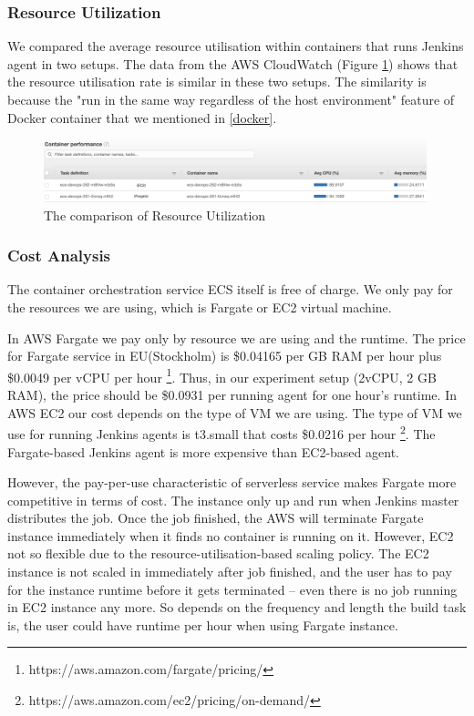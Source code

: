 \subsubsection{Resource Utilization}
We compared the average resource utilisation within containers that runs Jenkins agent in two setups. The data from the AWS CloudWatch (Figure \ref{fig:utilizationecs}) shows that the resource utilisation rate is similar in these two setups. The similarity is because the "run in the same way regardless of the host environment" \cite{WhatisaC60:online} feature of Docker container that we mentioned in \ref{docker}.
\begin{figure}[h]
\centering
\includegraphics[width=0.99\textwidth]{pics/utilizationecs.png}
\caption{The comparison of Resource Utilization}
\label{fig:utilizationecs}
\end{figure}
\subsubsection{Cost Analysis}
The container orchestration service ECS itself is free of charge. We only pay for the resources we are using, which is Fargate or EC2 virtual machine.
\par
In AWS Fargate we pay only by resource we are using and the runtime. The price for Fargate service in EU(Stockholm) is \$0.04165 per GB RAM per hour plus \$0.0049 per vCPU per hour \footnote{https://aws.amazon.com/fargate/pricing/}. Thus, in our experiment setup (2vCPU, 2 GB RAM), the price should be \$0.0931 per running agent for one hour's runtime.
In AWS EC2 our cost depends on the type of VM we are using. The type of VM we use for running Jenkins agents is t3.small that costs \$0.0216 per hour \footnote{https://aws.amazon.com/ec2/pricing/on-demand/}. The Fargate-based Jenkins agent is more expensive than EC2-based agent.
\par
However, the pay-per-use characteristic of serverless service makes Fargate more competitive in terms of cost. The instance only up and run when Jenkins master distributes the job. Once the job finished, the AWS will terminate Fargate instance immediately when it finds no container is running on it. However, EC2 not so flexible due to the resource-utilisation-based scaling policy. The EC2 instance is not scaled in immediately after job finished, and the user has to pay for the instance runtime before it gets terminated -- even there is no job running in EC2 instance any more. So depends on the frequency and length the build task is, the user could have runtime per hour when using Fargate instance.

